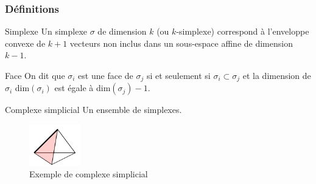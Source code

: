 \documentclass{beamer}
\begin{document}
\begin{frame}
    \frametitle{Définitions}
    \begin{block}{Simplexe}
        Un simplexe $\sigma$ de dimension $k$ (ou $k$-simplexe) correspond à l'enveloppe convexe de $k+1$ vecteurs non inclus dans un sous-espace affine de dimension $k-1$.
    \end{block}

    \begin{block}{Face}
        On dit que $\sigma_i$ est une face de $\sigma_j$ si et seulement si $\sigma_i \subset \sigma_j$ et la dimension de $\sigma_i$ dim$(\sigma_i)$ est égale à dim$(\sigma_j) - 1$.
    \end{block}

    \begin{block}{Complexe simplicial}
        Un ensemble de simplexes.
    \end{block}

    \begin{figure}
        \includegraphics[width=0.2\textwidth]{../images/SimpFaceCompl.png}
        \centering
        \caption{Exemple de complexe simplicial}
    \end{figure}
    
\end{frame}
\end{document}

